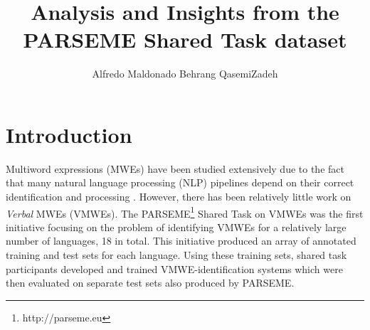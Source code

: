 \documentclass[output=paper
,modfonts
,nonflat,draftmode]{langsci/langscibook}
\title{Analysis and Insights from the PARSEME Shared Task dataset}
\author{%
 Alfredo Maldonado\affiliation{ADAPT Centre, Trinity College Dublin}\lastand 
 Behrang QasemiZadeh\affiliation{University of Düsseldorf}
}
\begin{document}
\maketitle
\label{MALDONADO-CHAPTER}
\section{Introduction} 






%

Multiword expressions (MWEs) have been studied extensively due to the fact that many natural language processing (NLP) pipelines depend on their correct identification and processing \citep{Sag2002a}. However, there has been relatively little work on \emph{Verbal} MWEs (VMWEs). The PARSEME\footnote{http://parseme.eu} Shared Task on VMWEs \citep{MWEWorkshop} was the first initiative focusing on the problem of identifying VMWEs for a relatively large number of languages, 18 in total. This initiative produced an array of annotated training and test sets for each language. Using these training sets, shared task participants developed and trained VMWE-identification systems which were then evaluated on separate test sets also produced by PARSEME. 
\end{document}
